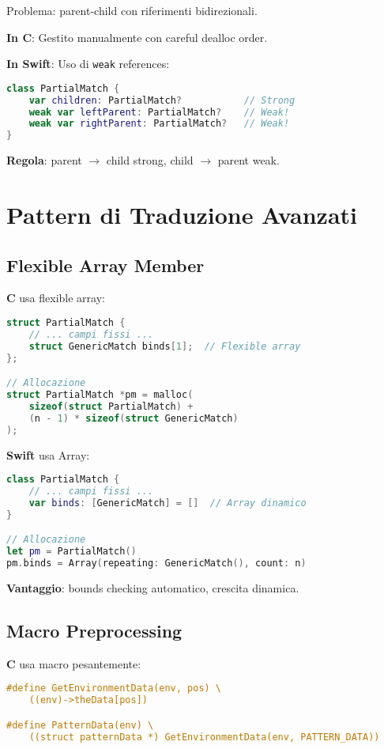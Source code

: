 Problema: parent-child con riferimenti bidirezionali.

\textbf{In C}: Gestito manualmente con careful dealloc order.

\textbf{In Swift}: Uso di \texttt{weak} references:

\begin{lstlisting}[language=Swift]
class PartialMatch {
    var children: PartialMatch?           // Strong
    weak var leftParent: PartialMatch?    // Weak!
    weak var rightParent: PartialMatch?   // Weak!
}
\end{lstlisting}

\textbf{Regola}: parent $\to$ child strong, child $\to$ parent weak.

\section{Pattern di Traduzione Avanzati}

\subsection{Flexible Array Member}

\textbf{C} usa flexible array:
\begin{lstlisting}[language=C]
struct PartialMatch {
    // ... campi fissi ...
    struct GenericMatch binds[1];  // Flexible array
};

// Allocazione
struct PartialMatch *pm = malloc(
    sizeof(struct PartialMatch) + 
    (n - 1) * sizeof(struct GenericMatch)
);
\end{lstlisting}

\textbf{Swift} usa Array:
\begin{lstlisting}[language=Swift]
class PartialMatch {
    // ... campi fissi ...
    var binds: [GenericMatch] = []  // Array dinamico
}

// Allocazione
let pm = PartialMatch()
pm.binds = Array(repeating: GenericMatch(), count: n)
\end{lstlisting}

\textbf{Vantaggio}: bounds checking automatico, crescita dinamica.

\subsection{Macro Preprocessing}

\textbf{C} usa macro pesantemente:
\begin{lstlisting}[language=C]
#define GetEnvironmentData(env, pos) \
    ((env)->theData[pos])

#define PatternData(env) \
    ((struct patternData *) GetEnvironmentData(env, PATTERN_DATA))
\end{lstlisting}

